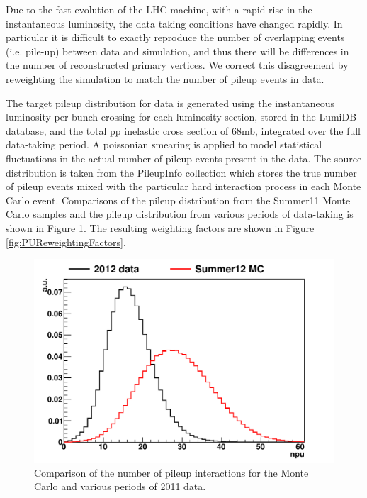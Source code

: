  Due to the fast evolution of the LHC machine, with a rapid rise in the
instantaneous luminosity, the data taking conditions have changed
rapidly.  In particular it is difficult to exactly reproduce the
number of overlapping events (i.e. pile-up) between data and
simulation, and thus there will be differences in the number of
reconstructed primary vertices. We correct this disagreement by
reweighting the simulation to match the number of pileup events in data. 

The target pileup distribution for data is generated using the instantaneous luminosity 
per bunch crossing for each luminosity section, stored in the LumiDB database, 
and the total pp inelastic cross section of $68$mb, integrated over the 
full data-taking period. A poissonian smearing is applied to model
statistical fluctuations in the actual number of pileup events 
present in the data. The source distribution is taken from the PileupInfo
collection which stores the true number of pileup events mixed with the 
particular hard interaction process in each Monte Carlo event. Comparisons of the
pileup distribution from the Summer11 Monte Carlo samples and the pileup 
distribution from various periods of data-taking is shown in Figure 
\ref{fig:NPU}. The resulting weighting factors are shown in Figure 
\ref{fig:PUReweightingFactors}. 

 
\begin{figure}[hbt]
\begin{center}
\includegraphics[width=0.7\linewidth]{figures/NPUDistributions.pdf}
\caption{\label{fig:NPU} Comparison of the number of pileup interactions 
for the Monte Carlo and various periods of 2011 data.}
\end{center}
\end{figure}

